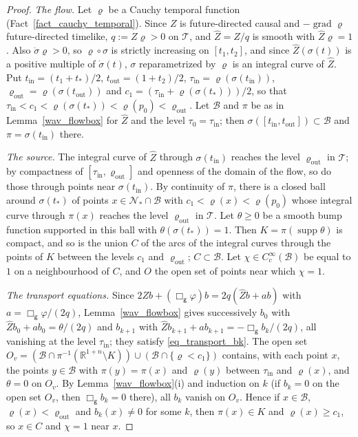 \documentclass[11pt,a4paper,reqno]{amsart}
\theoremstyle{definition}
\numberwithin{equation}{section}
\newcommand{\R}{\mathbb{R}}
\newcommand{\cB}{\mathcal{B}}
\newcommand{\cN}{\mathcal{N}}
\newcommand{\cT}{\mathcal{T}}
\newcommand{\sg}{\mathsf{g}}
\newcommand{\supp}{\operatorname{supp}}
\newcommand{\grad}{\operatorname{grad}}
\begin{document}
\begin{proof}
\emph{The flow.} Let $\varrho$ be a Cauchy temporal function (Fact~\ref{fact_cauchy_temporal}). Since $Z$ is future-directed
causal and $-\grad\varrho$ future-directed timelike, $q:=Z\varrho>0$ on $\cT$, and $\hat Z=Z/q$ is smooth with $\hat Z\varrho=1$.
Also $\dot\sigma\varrho>0$, so $\varrho\circ\sigma$ is strictly increasing on $[t_1,t_2]$, and since $\hat Z(\sigma(t))$ is a
positive multiple of $\dot\sigma(t)$, $\sigma$ reparametrized by $\varrho$ is an integral curve of $\hat Z$. Put
$t_{\mathrm{in}}=(t_1+t_*)/2$, $t_{\mathrm{out}}=(1+t_2)/2$, $\tau_{\mathrm{in}}=\varrho(\sigma(t_{\mathrm{in}}))$,
$\varrho_{\mathrm{out}}=\varrho(\sigma(t_{\mathrm{out}}))$ and $c_1=(\tau_{\mathrm{in}}+\varrho(\sigma(t_*)))/2$, so that
$\tau_{\mathrm{in}}<c_1<\varrho(\sigma(t_*))<\varrho(p_0)<\varrho_{\mathrm{out}}$. Let $\cB$ and $\pi$ be as in
Lemma~\ref{wav_flowbox} for $\hat Z$ and the level $\tau_0=\tau_{\mathrm{in}}$; then $\sigma([t_{\mathrm{in}},t_{\mathrm{out}}])\subset\cB$
and $\pi=\sigma(t_{\mathrm{in}})$ there.

\emph{The source.} The integral curve of $\hat Z$ through $\sigma(t_{\mathrm{in}})$ reaches the level $\varrho_{\mathrm{out}}$ in
$\cT$; by compactness of $[\tau_{\mathrm{in}},\varrho_{\mathrm{out}}]$ and openness of the domain of the flow, so do those
through points near $\sigma(t_{\mathrm{in}})$. By continuity of $\pi$, there is a closed ball around $\sigma(t_*)$ of points
$x\in\cN_*\cap\cB$ with $c_1<\varrho(x)<\varrho(p_0)$ whose integral curve through $\pi(x)$ reaches the level
$\varrho_{\mathrm{out}}$ in $\cT$. Let $\theta\ge0$ be a smooth bump function supported in this ball with
$\theta(\sigma(t_*))=1$. Then $K=\pi(\supp\theta)$ is compact, and so is the union $C$ of the arcs of the integral curves
through the points of $K$ between the levels $c_1$ and $\varrho_{\mathrm{out}}$; $C\subset\cB$. Let $\chi\in C_c^\infty(\cB)$
be equal to $1$ on a neighbourhood of $C$, and $O$ the open set of points near which $\chi=1$.

\emph{The transport equations.} Since $2Zb+(\Box_\sg\varphi)b=2q(\hat Zb+ab)$ with $a=\Box_\sg\varphi/(2q)$,
Lemma~\ref{wav_flowbox} gives successively $b_0$ with $\hat Zb_0+ab_0=\theta/(2q)$ and $b_{k+1}$ with
$\hat Zb_{k+1}+ab_{k+1}=-\Box_\sg b_k/(2q)$, all vanishing at the level $\tau_{\mathrm{in}}$; they satisfy
\eqref{eq_transport_bk}. The open set
$O_v=(\cB\cap\pi^{-1}(\R^{1+n}\setminus K))\cup(\cB\cap\{\varrho<c_1\})$ contains, with each point $x$, the points $y\in\cB$
with $\pi(y)=\pi(x)$ and $\varrho(y)$ between $\tau_{\mathrm{in}}$ and $\varrho(x)$, and $\theta=0$ on $O_v$. By
Lemma~\ref{wav_flowbox}(i) and induction on $k$ (if $b_k=0$ on the open set $O_v$, then $\Box_\sg b_k=0$ there), all $b_k$
vanish on $O_v$. Hence if $x\in\cB$, $\varrho(x)<\varrho_{\mathrm{out}}$ and $b_k(x)\ne0$ for some $k$, then $\pi(x)\in K$ and
$\varrho(x)\ge c_1$, so $x\in C$ and $\chi=1$ near $x$.


\end{proof}
\end{document}
